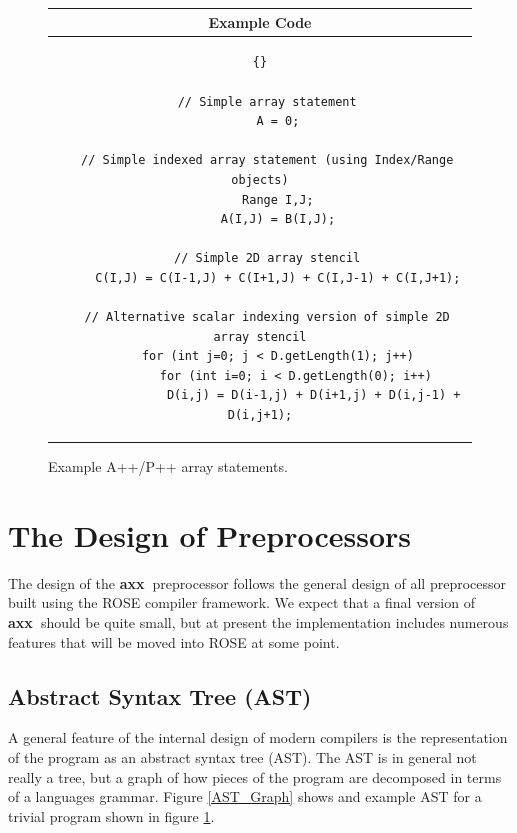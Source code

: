 \documentclass[10pt]{article}
\newcommand{\axx}{{\bf axx\ }}
\begin{document}
\begin{figure}[tb]
\begin{center}
\begin{tabular}{|c|} \hline
 Example Code \\\hline\hline
\begin{lstlisting}{}

  // Simple array statement
     A = 0;

  // Simple indexed array statement (using Index/Range objects)
     Range I,J;
     A(I,J) = B(I,J);

  // Simple 2D array stencil
     C(I,J) = C(I-1,J) + C(I+1,J) + C(I,J-1) + C(I,J+1);

  // Alternative scalar indexing version of simple 2D array stencil
     for (int j=0; j < D.getLength(1); j++)
          for (int i=0; i < D.getLength(0); i++)
               D(i,j) = D(i-1,j) + D(i+1,j) + D(i,j-1) + D(i,j+1);

\end{lstlisting}
\\\hline
\end{tabular}
\end{center}
\caption{ Example A++/P++ array statements. }
\label{AST_Code}
\end{figure}

\section{The Design of Preprocessors}

    The design of the \axx preprocessor follows the general design of all preprocessor built using
the ROSE compiler framework. We expect that a final version of \axx should be quite small, but at
present the implementation includes numerous features that will be moved into ROSE at some point.

\subsection{Abstract Syntax Tree (AST)}

     A general feature of the internal design of modern compilers is the representation of the
program as an abstract syntax tree (AST).  The AST is in general not really a tree, but a graph of
how pieces of the program are decomposed in terms of a languages grammar.  Figure \ref{AST_Graph}
shows and example AST for a trivial program shown in figure \ref{AST_Code}.
\end{document}
